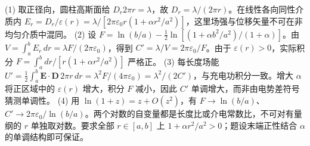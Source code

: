 (1) 取正径向，圆柱高斯面给 \(D_r2\pi r=\lambda\)，故 \(D_r=\lambda/(2\pi r)\)。在线性各向同性介质内 \(E_r=D_r/\varepsilon(r)=\lambda/[2\pi\varepsilon_0r(1+\alpha r^2/a^2)]\)，这里场强与位移矢量不可在非均匀介质中混同。
(2) 设 \(F=\ln(b/a)-\frac12\ln[(1+\alpha b^2/a^2)/(1+\alpha)]\)。由 \(V=\int_a^bE_r\,dr=\lambda F/(2\pi\varepsilon_0)\)，得到 \(C'=\lambda/V=2\pi\varepsilon_0/F\)。由于 \(\varepsilon(r)>0\)，实际积分 \(F=\int_a^b dr/[r(1+\alpha r^2/a^2)]\) 严格正。
(3) 每长度场能 \(U'=\frac12\int_a^b\mathbf E\cdot\mathbf D\,2\pi r\,dr=\lambda^2F/(4\pi\varepsilon_0)=\lambda^2/(2C')\)，与充电功积分一致。增大 \(\alpha\) 将正区域中的 \(\varepsilon(r)\) 增大，积分 \(F\) 减小，因此 \(C'\) 单调增大，而非由电势差符号猜测单调性。
(4) 用 \(\ln(1+z)=z+O(z^2)\)，有 \(F\to\ln(b/a)\)、\(C'\to2\pi\varepsilon_0/\ln(b/a)\)。两个对数的自变量都是长度比或介电常数比，不可对有量纲的 \(r\) 单独取对数。要求全部 \(r\in[a,b]\) 上 \(1+\alpha r^2/a^2>0\)；题设末端正性结合 \(\alpha\) 的单调结构即可保证。
